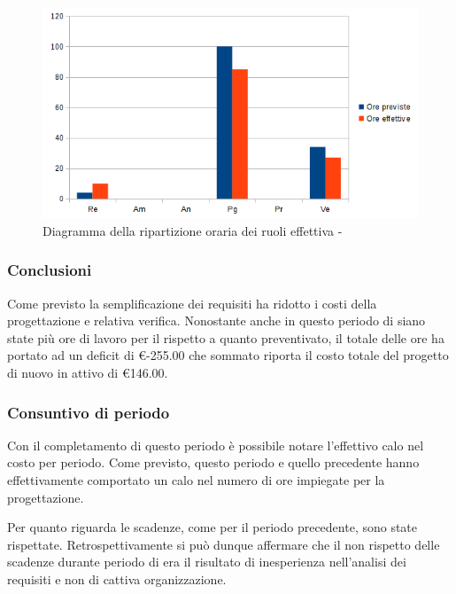 \documentclass[12pt,a4paper]{article}
\begin{document}
\begin{center}
	\begin{figure}[H]
		\centering
		\includegraphics[width=\textwidth]{../img/diagrammaBarreProgettazioneDiDettaglioConsuntivo.png}
		\caption{Diagramma della ripartizione oraria dei ruoli effettiva - \FPD{}}
	\end{figure}
\end{center}

\subsubsection{Conclusioni}
Come previsto la semplificazione dei requisiti ha ridotto i costi della progettazione e relativa verifica. Nonostante anche in questo periodo di siano state più ore di lavoro per il \RE{} rispetto a quanto preventivato, il totale delle ore ha portato ad un deficit di \euro{}-255.00 che sommato riporta il costo totale del progetto di nuovo in attivo di \euro{}146.00.

\subsubsection{Consuntivo di periodo}

\par Con il completamento di questo periodo è possibile notare l'effettivo calo nel costo per periodo. Come previsto, questo periodo e quello precedente hanno effettivamente comportato un calo nel numero di ore impiegate per la progettazione. \\

\par Per quanto riguarda le scadenze, come per il periodo precedente, sono state rispettate. Retrospettivamente si può dunque affermare che il non rispetto delle scadenze durante periodo di \FA{} era  il risultato di inesperienza nell'analisi dei requisiti e non di cattiva organizzazione. \\
\end{document}
